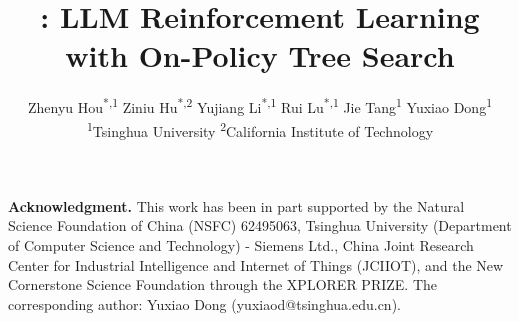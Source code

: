 \documentclass[11pt]{article}
\title{\model: LLM Reinforcement Learning with On-Policy Tree Search}
\author{
  Zhenyu Hou\textsuperscript{*,1} \quad
  Ziniu Hu\textsuperscript{*,2} \quad
  Yujiang Li\textsuperscript{*,1} \quad
  Rui Lu\textsuperscript{*,1} \quad
  Jie Tang\textsuperscript{1} \quad  Yuxiao Dong\textsuperscript{1} 
  \\
      \textsuperscript{1}Tsinghua University \quad
    \textsuperscript{2}California Institute of Technology 
  }
\newcommand{\vpara}[1]{\vspace{0.04in}\noindent\textbf{#1}\xspace}
\begin{document}
\maketitle

\renewcommand{\thefootnote}{\fnsymbol{footnote}}
\renewcommand{\thefootnote}{\arabic{footnote}}









\vpara{Acknowledgment.} This work has been in part supported by the Natural Science Foundation of China (NSFC) 62495063, Tsinghua University (Department of Computer Science and Technology) - Siemens Ltd., China Joint Research Center for Industrial Intelligence and Internet of Things (JCIIOT), and the New Cornerstone Science Foundation through the XPLORER PRIZE.
The corresponding author: Yuxiao Dong (yuxiaod@tsinghua.edu.cn). 





%

% 
% 


\appendix



\newpage


\end{document}

